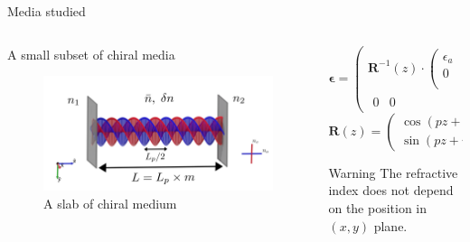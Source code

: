 \documentclass[aspectratio=169]{beamer}
\begin{document}
\begin{frame}{Media studied}
	\begin{columns}
		\begin{column}{0.5\textwidth}
			{\huge A small subset of chiral media}
			\begin{figure}
				\centering
				\includegraphics[width=\linewidth]{images/simple_cavity}
				\caption{A slab of chiral medium}
			\end{figure}
		\end{column}
		\begin{column}{0.5\textwidth}
			\begin{equation*}
				\bm{\epsilon} = \begin{pmatrix}\bm{R}^{-1}(z)\cdot\begin{pmatrix}
				\epsilon_a & 0\\
				0 & \epsilon_b\\
				\end{pmatrix}\cdot\bm{R}(z) & \begin{matrix}
				0\\0
				\end{matrix}\\
				\begin{matrix}
				0 & 0
				\end{matrix} & \epsilon_c
				\end{pmatrix}
			\end{equation*}
			\begin{equation*}
				\bm{R}(z) = \begin{pmatrix}
				\cos(pz+\psi) & -\sin(pz+\psi)\\
				\sin(pz+\psi) & \cos(pz+\psi)
				\end{pmatrix}
			\end{equation*}
			\begin{alertblock}{Warning}
				The refractive index does not depend on the position in $(x,y)$ plane.
			\end{alertblock}
		\end{column}
	\end{columns}	
\end{frame}
\end{document}
